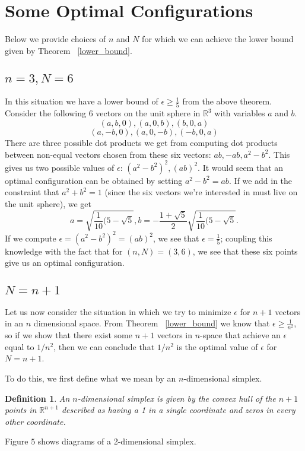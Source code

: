 \documentclass[11pt,letterpaper,twoside,english]{article}
\theoremstyle{theorem}
\newtheorem{definition}[theorem]{Definition}
\theoremstyle{remark}
\providecommand{\R}{\mathbb{R}}
\begin{document}
\section{Some Optimal Configurations}
Below we provide choices of $n$ and $N$ for which we can achieve the lower bound given by Theorem ~\ref{lower_bound}.
\subsection{$n=3,N=6$}
In this situation we have a lower bound of $\epsilon\ge\frac{1}{5}$ from the above theorem. Consider the following 6 vectors on the unit sphere in $\R^3$ with variables $a$ and $b$. 
$$
(a,b,0),(a,0,b),(b,0,a)
$$
$$
(a,-b,0),(a,0,-b),(-b,0,a)
$$
There are three possible dot products we get from computing dot products between non-equal vectors chosen from these six vectors: $ab,-ab,a^2-b^2$. This gives us two possible values of $\epsilon$: $(a^2-b^2)^2,(ab)^2$. It would seem that an optimal configuration can be obtained by setting $a^2-b^2=ab$. If we add in the constraint that $a^2+b^2=1$ (since the six vectors we're interested in must live on the unit sphere), we get
$$
a=\sqrt{\frac{1}{10}(5-\sqrt{5}}, b=-\frac{1+\sqrt{5}}{2}\sqrt{\frac{1}{10}(5-\sqrt{5}}. 
$$
If we compute $\epsilon=(a^2-b^2)^2=(ab)^2$, we see that $\epsilon=\frac{1}{5}$; coupling this knowledge with the fact that for $(n, N) = (3, 6)$, we see that these six points give us an optimal configuration.
\subsection{$N=n+1$}
Let us now consider the situation in which we try to minimize $\epsilon$ for $n+1$ vectors in an $n$ dimensional space. From Theorem ~\ref{lower_bound} we know that $\epsilon\ge \frac{1}{n^2}$, so if we show that there exist some $n+1$ vectors in $n$-space that achieve an $\epsilon$ equal to $1/n^2$, then we can conclude that $1/n^2$ is the optimal value of $\epsilon$ for $N = n+1$.

To do this, we first define what we mean by an $n$-dimensional simplex. 

\begin{definition}
An $n$-dimensional simplex is given by the convex hull of the $n+1$ points in $\R^{n+1}$ described as having a 1 in a single coordinate and zeros in every other coordinate. 
\end{definition}

Figure $5$ shows diagrams of a 2-dimensional simplex.
\end{document}

